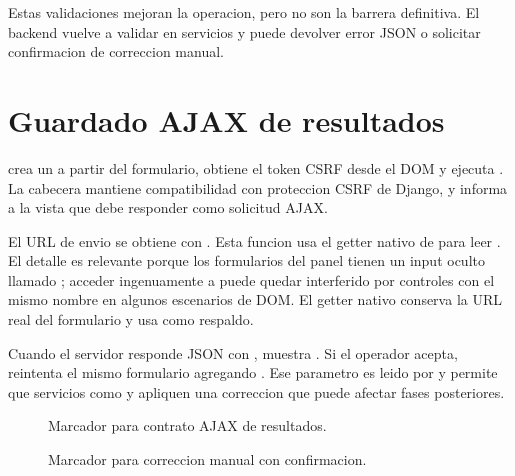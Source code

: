 Estas validaciones mejoran la operacion, pero no son la barrera definitiva. El backend vuelve a validar en servicios y puede devolver error JSON o solicitar confirmacion de correccion manual.

\section{Guardado AJAX de resultados}
\label{sec:javascript-guardado-ajax}

 crea un  a partir del formulario, obtiene el token CSRF desde el DOM y ejecuta . La cabecera  mantiene compatibilidad con proteccion CSRF de Django, y  informa a la vista que debe responder como solicitud AJAX.

El URL de envio se obtiene con . Esta funcion usa el getter nativo de  para leer . El detalle es relevante porque los formularios del panel tienen un input oculto llamado ; acceder ingenuamente a  puede quedar interferido por controles con el mismo nombre en algunos escenarios de DOM. El getter nativo conserva la URL real del formulario y usa  como respaldo.

Cuando el servidor responde JSON con ,  muestra . Si el operador acepta, reintenta el mismo formulario agregando . Ese parametro es leido por  y permite que servicios como  y  apliquen una correccion que puede afectar fases posteriores.

\begin{figure}[H]
  \centering
  \caption{Marcador para contrato AJAX de resultados.}
  \label{fig:javascript-contrato-ajax}
\end{figure}

\begin{figure}[H]
  \centering
  \caption{Marcador para correccion manual con confirmacion.}
  \label{fig:javascript-correccion-confirmacion}
\end{figure}

